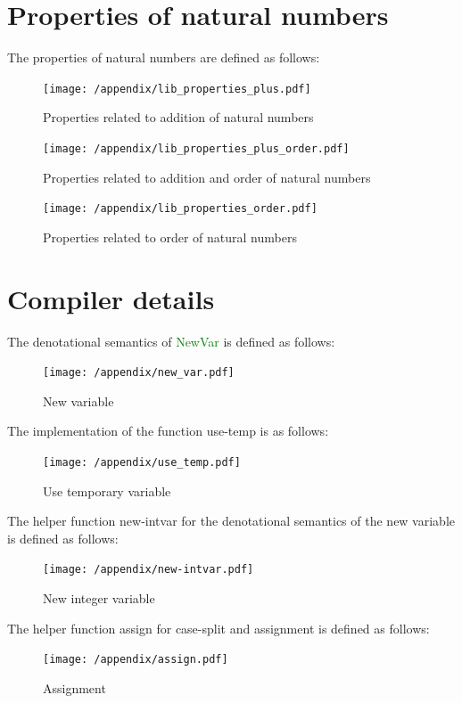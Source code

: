 \documentclass[12pt,a4paper]{report}
\theoremstyle{definition}
\newcommand{\gn}[1]{\textcolor{green}{#1}}
\newcommand{\gnt}[1]{\gn{\textsf{#1}}}
\begin{document}
\chapter{Properties of natural numbers} \label{app: lib_properties}
    The properties of natural numbers are defined as follows:
    \begin{figure}[H]
        \centering
        \texttt{[image: /appendix/lib\_properties\_plus.pdf]}
        \caption{Properties related to addition of natural numbers}
        \label{fig: lib_properties_plus}
    \end{figure}
    \begin{figure}
        \centering
        \texttt{[image: /appendix/lib\_properties\_plus\_order.pdf]}
        \caption{Properties related to addition and order of natural numbers}
        \label{fig: lib_properties_plus_order}
    \end{figure}
    \begin{figure}[H]
        \centering
        \texttt{[image: /appendix/lib\_properties\_order.pdf]}
        \caption{Properties related to order of natural numbers}
        \label{fig: lib_properties_order}
    \end{figure}

\chapter{Compiler details} \label{app: compiler_details}
    The denotational semantics of \gnt{NewVar} is defined as follows:
    \begin{figure}[H]
        \centering
        \texttt{[image: /appendix/new\_var.pdf]}
        \caption{New variable}
        \label{fig: new_var}
    \end{figure}

    The implementation of the function \textsf{use-temp} is as follows:
    \begin{figure}[H]
        \centering
        \texttt{[image: /appendix/use\_temp.pdf]}
        \caption{Use temporary variable}
        \label{fig: use_temp}
    \end{figure}



    The helper function \textsf{new-intvar} for the denotational semantics of the new variable is defined as follows:
    \begin{figure}[H]
        \centering
        \texttt{[image: /appendix/new-intvar.pdf]}
        \caption{New integer variable}
        \label{fig: new_intvar}
    \end{figure}
    The helper function \textsf{assign} for case-split and assignment is defined as follows:
    \begin{figure}[H]
        \centering
        \texttt{[image: /appendix/assign.pdf]}
        \caption{Assignment}
        \label{fig: assign}
    \end{figure}
\end{document}
